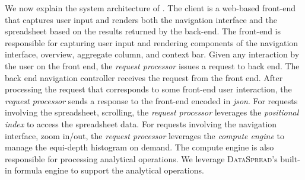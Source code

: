 We now explain the system architecture of \noah. 
The \noah client is a web-based front-end that captures user input and renders both the navigation interface and the spreadsheet 
based on the results returned by the back-end. 
The front-end is responsible for capturing user input and rendering components of the navigation interface, \ie overview, aggregate column, and context bar. 
Given any interaction by the user on the front end, 
the \emph{request processor} issues a request to back end.
The back end navigation controller receives the request from the front end. 
After processing the request that corresponds to some front-end user interaction, 
the \emph{request processor} sends a response to the front-end encoded in \emph{json}. 
For requests involving the spreadsheet, \eg scrolling, 
the \emph{request processor} leverages the \emph{positional index} 
to access the spreadsheet data. 
For requests involving the navigation interface, \eg zoom in/out, 
the \emph{request processor} leverages the \emph{compute engine} to manage the equi-depth histogram on demand. 
The compute engine is also responsible for processing analytical operations. We leverage {\scshape DataSpread}’s built-in formula engine to support the analytical operations.


